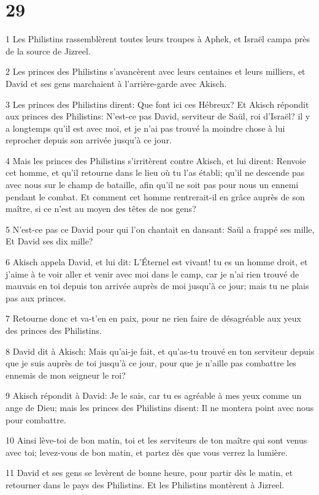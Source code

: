 \chapter{29}

\par 1 Les Philistins rassemblèrent toutes leurs troupes à Aphek, et Israël campa près de la source de Jizreel.
\par 2 Les princes des Philistins s'avancèrent avec leurs centaines et leurs milliers, et David et ses gens marchaient à l'arrière-garde avec Akisch.
\par 3 Les princes des Philistins dirent: Que font ici ces Hébreux? Et Akisch répondit aux princes des Philistins: N'est-ce pas David, serviteur de Saül, roi d'Israël? il y a longtemps qu'il est avec moi, et je n'ai pas trouvé la moindre chose à lui reprocher depuis son arrivée jusqu'à ce jour.
\par 4 Mais les princes des Philistins s'irritèrent contre Akisch, et lui dirent: Renvoie cet homme, et qu'il retourne dans le lieu où tu l'as établi; qu'il ne descende pas avec nous sur le champ de bataille, afin qu'il ne soit pas pour nous un ennemi pendant le combat. Et comment cet homme rentrerait-il en grâce auprès de son maître, si ce n'est au moyen des têtes de nos gens?
\par 5 N'est-ce pas ce David pour qui l'on chantait en dansant: Saül a frappé ses mille, Et David ses dix mille?
\par 6 Akisch appela David, et lui dit: L'Éternel est vivant! tu es un homme droit, et j'aime à te voir aller et venir avec moi dans le camp, car je n'ai rien trouvé de mauvais en toi depuis ton arrivée auprès de moi jusqu'à ce jour; mais tu ne plais pas aux princes.
\par 7 Retourne donc et va-t'en en paix, pour ne rien faire de désagréable aux yeux des princes des Philistins.
\par 8 David dit à Akisch: Mais qu'ai-je fait, et qu'as-tu trouvé en ton serviteur depuis que je suis auprès de toi jusqu'à ce jour, pour que je n'aille pas combattre les ennemis de mon seigneur le roi?
\par 9 Akisch répondit à David: Je le sais, car tu es agréable à mes yeux comme un ange de Dieu; mais les princes des Philistins disent: Il ne montera point avec nous pour combattre.
\par 10 Ainsi lève-toi de bon matin, toi et les serviteurs de ton maître qui sont venus avec toi; levez-vous de bon matin, et partez dès que vous verrez la lumière.
\par 11 David et ses gens se levèrent de bonne heure, pour partir dès le matin, et retourner dans le pays des Philistins. Et les Philistins montèrent à Jizreel.

